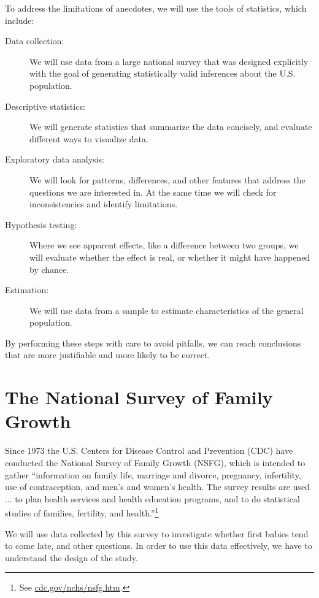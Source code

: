 \documentclass[12pt]{book}
\begin{document}
To address the limitations of anecdotes, we will use the tools
of statistics, which include:

\begin{description}

\item[Data collection:] We will use data from a large national survey
  that was designed explicitly with the goal of generating
  statistically valid inferences about the U.S. population.

\item[Descriptive statistics:] We will generate statistics that
  summarize the data concisely, and evaluate different ways to
  visualize data.

\item[Exploratory data analysis:] We will look for
  patterns, differences, and other features that address the questions
  we are interested in.  At the same time we will check for
  inconsistencies and identify limitations.

\item[Hypothesis testing:] Where we see apparent effects, like a
  difference between two groups, we will evaluate whether the effect
  is real, or whether it might have happened by chance.

\item[Estimation:] We will use data from a sample to estimate
  characteristics of the general population.

\end{description}

By performing these steps with care to avoid pitfalls, we can
reach conclusions that are more justifiable and more likely to be
correct.


\section{The National Survey of Family Growth}
\label{nsfg}

Since 1973 the U.S. Centers for Disease Control and Prevention (CDC)
have conducted the National Survey of Family Growth (NSFG),
which is intended to gather ``information on family life, marriage and
divorce, pregnancy, infertility, use of contraception, and men's and
women's health. The survey results are used ... to plan health services and
health education programs, and to do statistical studies of families,
fertility, and health.''\footnote{See
  \url{cdc.gov/nchs/nsfg.htm}.}

We will use data collected by this survey to investigate whether first
babies tend to come late, and other questions.  In order to use this
data effectively, we have to understand the design of the study.
\end{document}

